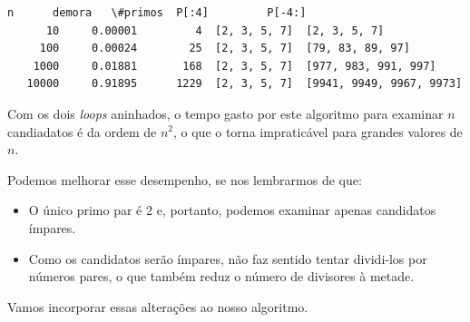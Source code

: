 \documentclass[11pt,a4paper]{article}
\providecommand{\tightlist}{%
      \setlength{\itemsep}{0pt}\setlength{\parskip}{0pt}}
\begin{document}
    \begin{Verbatim}[commandchars=\\\{\}]
       n      demora   \#primos  P[:4]         P[-4:]
      10     0.00001         4  [2, 3, 5, 7]  [2, 3, 5, 7]
     100     0.00024        25  [2, 3, 5, 7]  [79, 83, 89, 97]
    1000     0.01881       168  [2, 3, 5, 7]  [977, 983, 991, 997]
   10000     0.91895      1229  [2, 3, 5, 7]  [9941, 9949, 9967, 9973]

    \end{Verbatim}

    Com os dois \emph{loops} aninhados, o tempo gasto por este algoritmo
para examinar \(n\) candiadatos é da ordem de \(n^2\), o que o torna
impraticável para grandes valores de \(n\).

    Podemos melhorar esse desempenho, se nos lembrarmos de que:

\begin{itemize}
\tightlist
\item
  O único primo par é \(2\) e, portanto, podemos examinar apenas
  candidatos ímpares.
\item
  Como os candidatos serão ímpares, não faz sentido tentar dividi-los
  por números pares, o que também reduz o número de divisores à metade.
\end{itemize}

    Vamos incorporar essas alterações ao nosso algoritmo.
\end{document}
